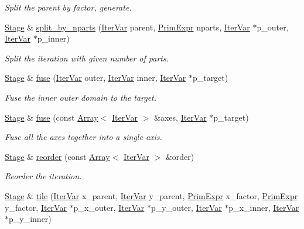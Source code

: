 \begin{DoxyCompactItemize}
\begin{DoxyCompactList}\small\item\em Split the parent by factor, generate. \end{DoxyCompactList}\item 
\hyperlink{classtvm_1_1te_1_1Stage}{Stage} \& \hyperlink{classtvm_1_1te_1_1Stage_a51432f38d9ec4792a2525023179ae604}{split\+\_\+by\+\_\+nparts} (\hyperlink{classtvm_1_1tir_1_1IterVar}{Iter\+Var} parent, \hyperlink{classtvm_1_1PrimExpr}{Prim\+Expr} nparts, \hyperlink{classtvm_1_1tir_1_1IterVar}{Iter\+Var} $\ast$p\+\_\+outer, \hyperlink{classtvm_1_1tir_1_1IterVar}{Iter\+Var} $\ast$p\+\_\+inner)
\begin{DoxyCompactList}\small\item\em Split the iteration with given number of parts. \end{DoxyCompactList}\item 
\hyperlink{classtvm_1_1te_1_1Stage}{Stage} \& \hyperlink{classtvm_1_1te_1_1Stage_a5658065d9cbbee620bbd107d30c4ae72}{fuse} (\hyperlink{classtvm_1_1tir_1_1IterVar}{Iter\+Var} outer, \hyperlink{classtvm_1_1tir_1_1IterVar}{Iter\+Var} inner, \hyperlink{classtvm_1_1tir_1_1IterVar}{Iter\+Var} $\ast$p\+\_\+target)
\begin{DoxyCompactList}\small\item\em Fuse the inner outer domain to the target. \end{DoxyCompactList}\item 
\hyperlink{classtvm_1_1te_1_1Stage}{Stage} \& \hyperlink{classtvm_1_1te_1_1Stage_a07b721494aa3c0c79e8a8654c433708f}{fuse} (const \hyperlink{classtvm_1_1Array}{Array}$<$ \hyperlink{classtvm_1_1tir_1_1IterVar}{Iter\+Var} $>$ \&axes, \hyperlink{classtvm_1_1tir_1_1IterVar}{Iter\+Var} $\ast$p\+\_\+target)
\begin{DoxyCompactList}\small\item\em Fuse all the axes together into a single axis. \end{DoxyCompactList}\item 
\hyperlink{classtvm_1_1te_1_1Stage}{Stage} \& \hyperlink{classtvm_1_1te_1_1Stage_ad96cd240a92df9cafae89cdf2a7e302e}{reorder} (const \hyperlink{classtvm_1_1Array}{Array}$<$ \hyperlink{classtvm_1_1tir_1_1IterVar}{Iter\+Var} $>$ \&order)
\begin{DoxyCompactList}\small\item\em Reorder the iteration. \end{DoxyCompactList}\item 
\hyperlink{classtvm_1_1te_1_1Stage}{Stage} \& \hyperlink{classtvm_1_1te_1_1Stage_a7a42ba3166c506fcacf596ac13553b67}{tile} (\hyperlink{classtvm_1_1tir_1_1IterVar}{Iter\+Var} x\+\_\+parent, \hyperlink{classtvm_1_1tir_1_1IterVar}{Iter\+Var} y\+\_\+parent, \hyperlink{classtvm_1_1PrimExpr}{Prim\+Expr} x\+\_\+factor, \hyperlink{classtvm_1_1PrimExpr}{Prim\+Expr} y\+\_\+factor, \hyperlink{classtvm_1_1tir_1_1IterVar}{Iter\+Var} $\ast$p\+\_\+x\+\_\+outer, \hyperlink{classtvm_1_1tir_1_1IterVar}{Iter\+Var} $\ast$p\+\_\+y\+\_\+outer, \hyperlink{classtvm_1_1tir_1_1IterVar}{Iter\+Var} $\ast$p\+\_\+x\+\_\+inner, \hyperlink{classtvm_1_1tir_1_1IterVar}{Iter\+Var} $\ast$p\+\_\+y\+\_\+inner)

\end{DoxyCompactItemize}
